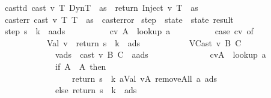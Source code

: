 \begin{isabellebody}
\ \ casttd{\isacharcolon}\ {\isachardoublequoteopen}cast\ v\ T\ DynT\ {\isasymmu}\ as\ {\isacharequal}\ return\ {\isacharparenleft}Inject\ v\ T{\isacharcomma}\ {\isasymmu}{\isacharcomma}\ as{\isacharparenright}{\isachardoublequoteclose}\ {\isacharbar}\isanewline
\ \ casterr{\isacharcolon}\ {\isachardoublequoteopen}cast\ v\ T{}\ T{}\ {\isasymmu}\ as\ {\isacharequal}\ cast{\isacharunderscore}error{\isachardoublequoteclose}\isanewline
\isanewline
{}\isamarkupfalse \ step\ {\isacharcolon}{\isacharcolon}\ {\isachardoublequoteopen}state\ {\isasymRightarrow}\ state\ result{\isachardoublequoteclose}\ \isanewline
\ \ {\isachardoublequoteopen}step\ {\isacharparenleft}s{\isacharcomma}\ {\isasymrho}{\isacharcomma}\ k{\isacharcomma}\ {\isasymmu}{\isacharcomma}\ a{\isacharhash}ads{\isacharparenright}\ {\isacharequal}\ \isanewline
\ \ \ \ \ \ \ \ {\isacharparenleft}{\isacharparenleft}cv{\isacharcomma}\ A{\isacharparenright}\ {\isacharcolon}{\isacharequal}\ lookup\ a\ {\isasymmu}{\isacharsemicolon}\isanewline
\ \ \ \ \ \ \ \ \ {\isacharparenleft}case\ cv\ of\isanewline
\ \ \ \ \ \ \ \ \ \ \ \ Val\ v\ {\isasymRightarrow}\ return\ {\isacharparenleft}s{\isacharcomma}\ {\isasymrho}{\isacharcomma}\ k{\isacharcomma}\ {\isasymmu}{\isacharcomma}\ ads{\isacharparenright}\isanewline
\ \ \ \ \ \ \ \ \ \ {\isacharbar}\ VCast\ v\ B\ C\ {\isasymRightarrow}\isanewline
\ \ \ \ \ \ \ \ \ \ \ \ \ \ {\isacharparenleft}v{\isacharprime}{\isacharcomma}{\isasymmu}{\isacharprime}{\isacharcomma}ads{}{\isacharparenright}\ {\isacharcolon}{\isacharequal}\ cast\ v\ B\ C\ {\isasymmu}\ {\isacharparenleft}a{\isacharhash}ads{\isacharparenright}{\isacharsemicolon}\isanewline
\ \ \ \ \ \ \ \ \ \ \ \ \ \ {\isacharparenleft}cv{\isacharprime}{\isacharcomma}A{\isacharprime}{\isacharparenright}\ {\isacharcolon}{\isacharequal}\ lookup\ a\ {\isasymmu}{\isacharprime}{\isacharsemicolon}\isanewline
\ \ \ \ \ \ \ \ \ \ \ \ \ \ if\ A\ {\isasymsqsubseteq}\ A{\isacharprime}\ then\isanewline
\ \ \ \ \ \ \ \ \ \ \ \ \ \ \ \ \ \ return\ {\isacharparenleft}s{\isacharcomma}\ {\isasymrho}{\isacharcomma}\ k{\isacharcomma}\ {\isacharparenleft}a{\isacharcomma}{\isacharparenleft}Val\ v{\isacharprime}{\isacharcomma}A{\isacharparenright}{\isacharparenright}{\isacharhash}{\isasymmu}{\isacharprime}{\isacharcomma}\ removeAll\ a\ ads{}{\isacharparenright}\isanewline
\ \ \ \ \ \ \ \ \ \ \ \ \ \ else\ return\ {\isacharparenleft}s{\isacharcomma}\ {\isasymrho}{\isacharcomma}\ k{\isacharcomma}\ {\isasymmu}{\isacharprime}{\isacharcomma}\ ads{}{\isacharparenright}{\isacharparenright}{\isacharparenright}{\isachardoublequoteclose}\ {\isacharbar}\isanewline

\end{isabellebody}
